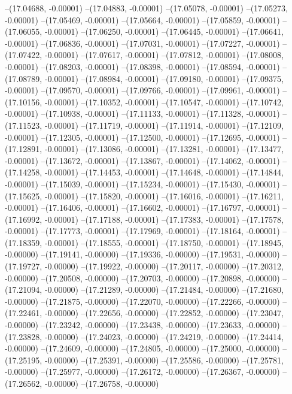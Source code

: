 --(17.04688, -0.00001)
--(17.04883, -0.00001)
--(17.05078, -0.00001)
--(17.05273, -0.00001)
--(17.05469, -0.00001)
--(17.05664, -0.00001)
--(17.05859, -0.00001)
--(17.06055, -0.00001)
--(17.06250, -0.00001)
--(17.06445, -0.00001)
--(17.06641, -0.00001)
--(17.06836, -0.00001)
--(17.07031, -0.00001)
--(17.07227, -0.00001)
--(17.07422, -0.00001)
--(17.07617, -0.00001)
--(17.07812, -0.00001)
--(17.08008, -0.00001)
--(17.08203, -0.00001)
--(17.08398, -0.00001)
--(17.08594, -0.00001)
--(17.08789, -0.00001)
--(17.08984, -0.00001)
--(17.09180, -0.00001)
--(17.09375, -0.00001)
--(17.09570, -0.00001)
--(17.09766, -0.00001)
--(17.09961, -0.00001)
--(17.10156, -0.00001)
--(17.10352, -0.00001)
--(17.10547, -0.00001)
--(17.10742, -0.00001)
--(17.10938, -0.00001)
--(17.11133, -0.00001)
--(17.11328, -0.00001)
--(17.11523, -0.00001)
--(17.11719, -0.00001)
--(17.11914, -0.00001)
--(17.12109, -0.00001)
--(17.12305, -0.00001)
--(17.12500, -0.00001)
--(17.12695, -0.00001)
--(17.12891, -0.00001)
--(17.13086, -0.00001)
--(17.13281, -0.00001)
--(17.13477, -0.00001)
--(17.13672, -0.00001)
--(17.13867, -0.00001)
--(17.14062, -0.00001)
--(17.14258, -0.00001)
--(17.14453, -0.00001)
--(17.14648, -0.00001)
--(17.14844, -0.00001)
--(17.15039, -0.00001)
--(17.15234, -0.00001)
--(17.15430, -0.00001)
--(17.15625, -0.00001)
--(17.15820, -0.00001)
--(17.16016, -0.00001)
--(17.16211, -0.00001)
--(17.16406, -0.00001)
--(17.16602, -0.00001)
--(17.16797, -0.00001)
--(17.16992, -0.00001)
--(17.17188, -0.00001)
--(17.17383, -0.00001)
--(17.17578, -0.00001)
--(17.17773, -0.00001)
--(17.17969, -0.00001)
--(17.18164, -0.00001)
--(17.18359, -0.00001)
--(17.18555, -0.00001)
--(17.18750, -0.00001)
--(17.18945, -0.00000)
--(17.19141, -0.00000)
--(17.19336, -0.00000)
--(17.19531, -0.00000)
--(17.19727, -0.00000)
--(17.19922, -0.00000)
--(17.20117, -0.00000)
--(17.20312, -0.00000)
--(17.20508, -0.00000)
--(17.20703, -0.00000)
--(17.20898, -0.00000)
--(17.21094, -0.00000)
--(17.21289, -0.00000)
--(17.21484, -0.00000)
--(17.21680, -0.00000)
--(17.21875, -0.00000)
--(17.22070, -0.00000)
--(17.22266, -0.00000)
--(17.22461, -0.00000)
--(17.22656, -0.00000)
--(17.22852, -0.00000)
--(17.23047, -0.00000)
--(17.23242, -0.00000)
--(17.23438, -0.00000)
--(17.23633, -0.00000)
--(17.23828, -0.00000)
--(17.24023, -0.00000)
--(17.24219, -0.00000)
--(17.24414, -0.00000)
--(17.24609, -0.00000)
--(17.24805, -0.00000)
--(17.25000, -0.00000)
--(17.25195, -0.00000)
--(17.25391, -0.00000)
--(17.25586, -0.00000)
--(17.25781, -0.00000)
--(17.25977, -0.00000)
--(17.26172, -0.00000)
--(17.26367, -0.00000)
--(17.26562, -0.00000)
--(17.26758, -0.00000)
